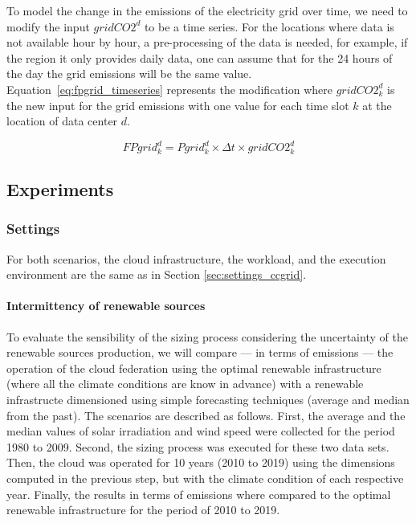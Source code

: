 To model the change in the emissions of the electricity grid over time, we need to modify the input $gridCO2^d$ to be a time series. For the locations where data is not available hour by hour, a pre-processing of the data is needed, for example, if the region it only provides daily data, one can assume that for the 24 hours of the day the grid emissions  will be the same value. Equation~\eqref{eq:fpgrid_timeseries} represents the modification where $gridCO2^d_k$ is the new input for the grid emissions with one value for each time slot $k$ at the location of data center $d$.


\begin{equation} \label{eq:fpgrid_timeseries}
FPgrid_k^d = Pgrid_k^d\times \Delta t \times gridCO2^d_k
\end{equation}

\subsection{Experiments}

\subsubsection{Settings}


For both scenarios, the cloud infrastructure, the workload, and the execution environment are the same as in Section  \ref{sec:settings_ccgrid}.

\paragraph{Intermittency of renewable sources}

To evaluate the sensibility of the sizing process considering the uncertainty of the renewable sources production, we will compare --- in terms of  emissions ---  the operation of the cloud federation using the optimal renewable infrastructure (where all the climate conditions are know in advance) with a renewable infrastructe dimensioned using simple forecasting techniques (average and median from the past). The scenarios are described as follows. First, the average and the median values of solar irradiation and wind speed were collected for the period 1980 to 2009. Second, the sizing process was executed for these two data sets. Then, the cloud was operated for 10 years (2010 to 2019) using the dimensions computed in the previous step, but with the climate condition of each respective year. Finally, the results in terms of  emissions where compared to the optimal renewable infrastructure for the period of 2010 to 2019.

